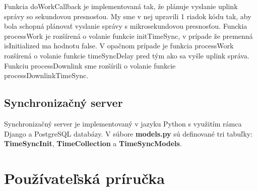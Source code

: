 Funkcia doWorkCallback je implementovaná tak, že plánuje vyslanie uplink správy so sekundovou presnosťou. My sme v nej upravili 1 riadok kódu tak, aby bola schopná plánovať vyslanie správy s mikrosekundovou presnosťou.
Funckia processWork je rozšírená o volanie funkcie initTimeSync, v prípade že premenná isInitialized ma hodnotu false. V opačnom prípade je funkcia processWork rozšírená o volanie funkcie timeSyncDelay pred tým ako sa vyšle uplink správa. Funkciu processDownlink sme rozšírili o volanie funkcie processDownlinkTimeSync.

\subsection{Synchronizačný server}

Synchronizačný server je implementovaný v jazyku Python s využitím rámca Django a PostgreSQL databázy. V súbore \textbf{models.py} sú definované tri tabuľky: \textbf{TimeSyncInit}, \textbf{TimeCollection} a \textbf{TimeSyncModels}.





\section{Používateľská príručka}






